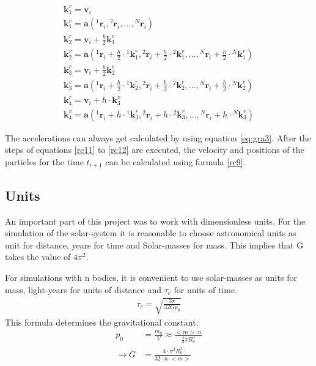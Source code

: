 \documentclass[10pt,a4paper]{article}
\begin{document}
\begin{align}
\label{rc11}
\mathbf{k}_1^r = \mathbf{v}_i \\
\mathbf{k}_{1}^{v} = \mathbf{a}({}^{1}\mathbf{r}_i, {}^{2}\mathbf{r}_i,..., {}^{N}\mathbf{r}_i) \\
\mathbf{k}_2^r = \mathbf{v}_i + \frac{h}{2} \mathbf{k}_1^{v}	\\
\mathbf{k}_2^{v} = \mathbf{a}({}^{1}\mathbf{r}_i + \frac{h}{2}\cdot {}^{1}\mathbf{k}_1^r, {}^{2}\mathbf{r}_i + \frac{h}{2}\cdot {}^{2}\mathbf{k}_1^r,..., {}^{N}\mathbf{r}_i + \frac{h}{2}\cdot {}^{N}\mathbf{k}_1^r)	\\
\mathbf{k}_3^r = \mathbf{v}_i + \frac{h}{2} \mathbf{k}_2^v	\\
\mathbf{k}_3^{v} = \mathbf{a}({}^{1}\mathbf{r}_i + \frac{h}{2}\cdot {}^{1}\mathbf{k}_2^r, {}^{2}\mathbf{r}_i + \frac{h}{2}\cdot {}^{2}\mathbf{k}_2^r,..., {}^{N}\mathbf{r}_i + \frac{h}{2}\cdot {}^{N}\mathbf{k}_2^r)	\\
\mathbf{k}_4^r = \mathbf{v}_i + h \cdot \mathbf{k}_3^v	\\
\label{rc12}
\mathbf{k}_4^{v} = \mathbf{a}({}^{1}\mathbf{r}_i + h\cdot {}^{1}\mathbf{k}_3^r, {}^{2}\mathbf{r}_i + h\cdot {}^{2}\mathbf{k}_3^r,..., {}^{N}\mathbf{r}_i + h\cdot {}^{N}\mathbf{k}_3^r)
\end{align}

The accelerations can always get calculated by using equation \eqref{eq:gra3}. After the steps of equations \eqref{rc11} to \eqref{rc12} are executed, the velocity and positions of the particles for the time $t_{i+1}$ can be calculated using formula \eqref{rc9}.

\subsection{Units}

An important part of this project was to work with dimensionless units. 
For the simulation of the solar-system it is reasonable to choose astronomical units as unit for distance, years for time and Solar-masses for mass. This implies that G takes the value of $4 \pi^2$. 

For simulations with n bodies, it is convenient to use solar-masses as units for mass, light-years for units of distance and $\tau_c$ for units of time. 
\begin{align}
\tau_c= \sqrt{\frac{3 \pi}{32 G p_0}}
\end{align}
This formula determines the gravitational constant:
\begin{align}
p_0&=\frac{m_0}{V}\approx \frac{<m> \cdot n}{\frac{4}{3}\pi R_0^3}\\
\rightarrow G&= \frac{4 \cdot \pi^2 R_0^3}{32 \cdot n \cdot <m>}
\end{align}
\end{document}

